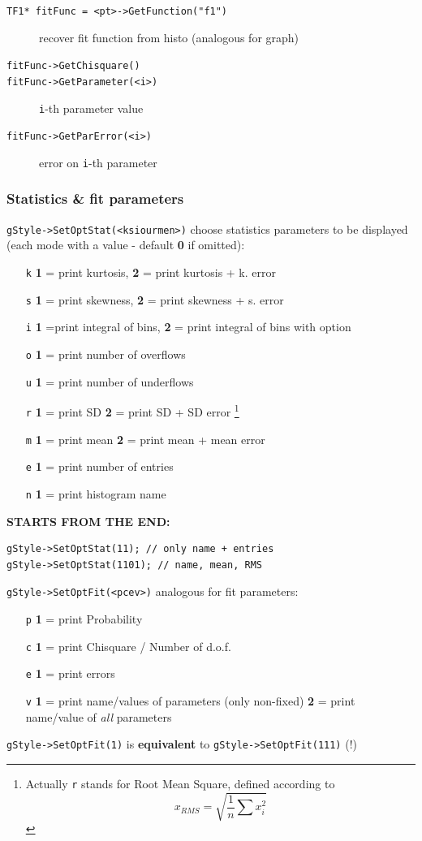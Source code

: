 \documentclass[10pt, oneside]{article}
\begin{document}
\begin{description}
\item[\texttt{TF1* fitFunc = <pt>->GetFunction("f1")}] recover fit function from histo (analogous for graph)
\item[\texttt{fitFunc->GetChisquare()}]
\item[\texttt{fitFunc->GetParameter(<i>)}] \texttt{i}-th parameter value
\item[\texttt{fitFunc->GetParError(<i>)}] error on \texttt{i}-th parameter
\end{description}

\subsubsection{Statistics \& fit parameters}
\texttt{gStyle->SetOptStat(<ksiourmen>)} choose statistics parameters to be displayed \\
(each mode with a value - default \textbf{0} if omitted):
\begin{itemize}
\item[\texttt{k}] \textbf{1} = print kurtosis, \textbf{2} = print kurtosis + k. error
\item[\texttt{s}] \textbf{1} = print skewness, \textbf{2} = print skewness + s. error
\item[\texttt{i}] \textbf{1} =print integral of bins, \textbf{2} = print integral of bins with option 
\item[\texttt{o}] \textbf{1} = print number of overflows
\item[\texttt{u}] \textbf{1} = print number of underflows
\item[\texttt{r}] \textbf{1} = print SD \textbf{2} = print SD + SD error \footnote{Actually \texttt{r} stands for Root Mean Square, defined according to 
\[x_{RMS} = \sqrt{\frac{1}{n} \sum x_i^2}\]
} 
\item[\texttt{m}] \textbf{1} = print mean \textbf{2} = print mean + mean error
\item[\texttt{e}] \textbf{1} = print number of entries
\item[\texttt{n}] \textbf{1} = print histogram name 
\end{itemize}
\textbf{STARTS FROM THE END:} 
\begin{verbatim}
gStyle->SetOptStat(11); // only name + entries
gStyle->SetOptStat(1101); // name, mean, RMS
\end{verbatim}
\texttt{gStyle->SetOptFit(<pcev>)} analogous for fit parameters:
\begin{itemize}
\item[\texttt{p}] \textbf{1} = print Probability
\item[\texttt{c}] \textbf{1} = print Chisquare / Number of d.o.f.
\item[\texttt{e}] \textbf{1} = print errors
\item[\texttt{v}] \textbf{1} = print name/values of parameters (only non-fixed) \textbf{2} = print name/value of \textit{all} parameters
\end{itemize}
\texttt{gStyle->SetOptFit(1)} is \textbf{equivalent} to \texttt{gStyle->SetOptFit(111)} (!)
\end{document}
